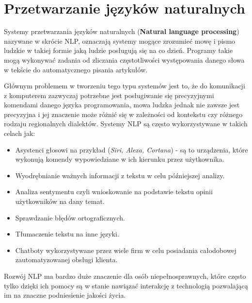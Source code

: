 
\chapter{Przetwarzanie języków naturalnych}
Systemy przetwarzania języków naturalnych (\textbf{Natural language processing}) nazywane 
w skrócie NLP, oznaczają systemy mogące zrozumieć mowę i pismo ludzkie w takiej
formie jaką ludzie posługują się na co dzień. Programy takie mogą wykonywać zadania od zliczania
częstotliwości występowania danego słowa w tekście do automatycznego pisania artykułów. 

Głównym problemem w tworzeniu tego typu systemów jest to, że do komunikacji z komputerem zazwyczaj
potrzebne jest posługiwanie się precyzyjnymi komendami danego języka programowania, mowa ludzka
jednak nie zawsze jest precyzyjna i jej znaczenie może różnić się w zależności od kontekstu czy
różnego rodzaju regionalnych dialektów. Systemy NLP są często wykorzystywane w takich 
celach jak:
\begin{itemize}
    \item Asystenci głosowi na przykład (\textit{Siri, Alexa, Cortana}) - są to urządzenia, które 
    wykonują komendy wypowiedziane w ich kierunku przez użytkownika.  
    \item Wyodrębnianie ważnych informacji z tekstu w celu późniejszej analizy.
    \item Analiza sentymentu czyli wnioskowanie na podstawie tekstu opinii użytkowników na dany temat.
    \item Sprawdzanie błędów ortograficznych.
    \item Tłumaczenie tekstu na inne języki.
    \item Chatboty wykorzystywane przez wiele firm w celu posiadania całodobowej zautomatyzowanej obsługi klienta.
\end{itemize}
Rozwój NLP ma bardzo duże znaczenie dla osób niepełnosprawnych, które często tylko dzięki ich pomocy są 
w stanie nawiązać interakcję z technologią pozwalającą im na znaczne podniesienie jakości życia. ~\cite{TextProcessing}
